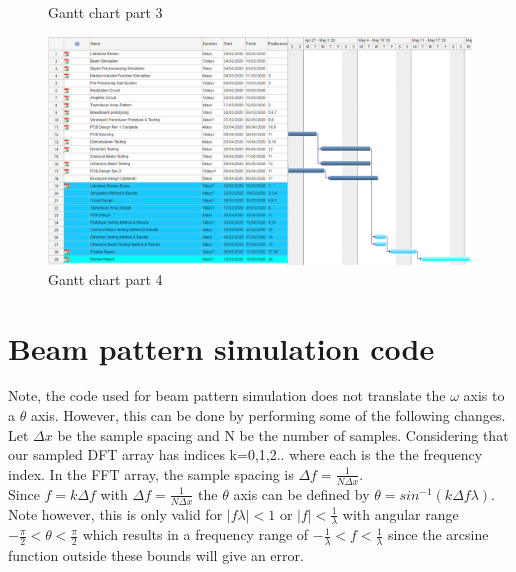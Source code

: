 \begin{appendices}
\begin{figure}[ht]
    \caption{Gantt chart part 3}
    \label{fig:gantt3}
\end{figure}
\begin{figure}[ht]
    \centering
    \includegraphics[width=\textwidth]{Figures/Gantt4.PNG}
    \caption{Gantt chart part 4}
    \label{fig:gantt4}
\end{figure}

\clearpage

\section{Beam pattern simulation code}
Note, the code used for beam pattern simulation does not translate the $\omega$ axis to a $\theta$ axis. However, this can be done by performing some of the following changes.\\
Let $\Delta x$ be the sample spacing and N be the number of samples. Considering that our sampled DFT array has indices k=0,1,2.. where each is the the frequency index. In the FFT array, the sample spacing is $\Delta f=\frac{1}{N\Delta x}$.\\
Since $f=k\Delta f$ with $\Delta f = \frac{1}{N\Delta x}$ the $\theta$ axis can be defined by $\theta = sin^{-1}(k\Delta f \lambda)$.
Note however, this is only valid for $\left|f \lambda \right | < 1 $ or $\left |f\right | < \frac{1}{\lambda} $ with angular range $-\frac{\pi}{2}<\theta<\frac{\pi}{2}$ which results in a frequency range of $-\frac{1}{\lambda} < f < \frac{1}{\lambda}$ since the arcsine function outside these bounds will give an error.\\






\end{appendices}
